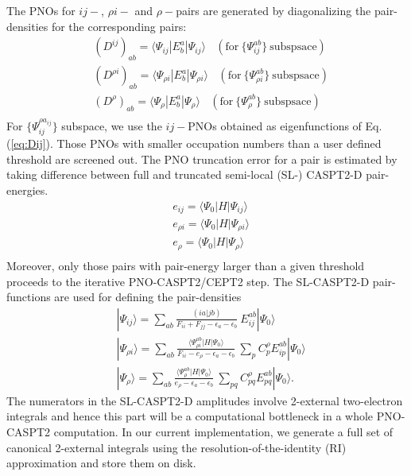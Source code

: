 \documentclass[aip,jcp,amsmath,twocolumn,floatfix,reprint,fleqn]{revtex4-1}
\begin{document}
%
The PNOs for $ij-$, $\rho i-$ and $\rho-$pairs are generated by diagonalizing the pair-densities for the corresponding pairs:
%
\begin{align}
  &(D^{ij})_{ab}    =\langle\Psi_{ij}    |E^a_b|\Psi_{ij}    \rangle \ \ \ \ (\text{for}\ \{\Psi_{ij}^{ab}\}\ \text{subspsace}) \label{eq:Dij}\\
  &(D^{\rho i})_{ab}=\langle\Psi_{\rho i}|E^a_b|\Psi_{\rho i}\rangle \ \ \ \ (\text{for}\ \{\Psi_{\rho i}^{ab}\}\ \text{subspsace})\\
  &(D^{\rho})_{ab}  =\langle\Psi_{\rho}  |E^a_b|\Psi_{\rho}  \rangle \ \ \ \ (\text{for}\ \{\Psi_{\rho}^{ab}\}\ \text{subspsace})\\  
\end{align}
%
For $\{\Psi_{ij}^{\rho a_{ij}}\}$ subspace, we use the $ij-$PNOs obtained as eigenfunctions of Eq. (\ref{eq:Dij}).
%
Those PNOs with smaller occupation numbers than a user defined threshold are screened out.
%
The PNO truncation error for a pair is estimated by taking difference between full and truncated semi-local (SL-) CASPT2-D pair-energies.
%
\begin{align}
  &e_{ij}=\langle\Psi_0|H|\Psi_{ij}\rangle \\
  &e_{\rho i}=\langle\Psi_0|H|\Psi_{\rho i}\rangle \\
  &e_{\rho}=\langle\Psi_0|H|\Psi_{\rho}\rangle \\  
\end{align}
%
Moreover, only those pairs with pair-energy larger than a given threshold proceeds to the iterative PNO-CASPT2/CEPT2 step.
%
The SL-CASPT2-D pair-functions are used for defining the pair-densities
%
\begin{align}
  &|\Psi_{ij}\rangle=\sum_{ab}\frac{(ia|jb)}{F_{ii}+F_{jj}-\epsilon_a-\epsilon_b}\ E_{ij}^{ab}|\Psi_0\rangle \\
  &|\Psi_{\rho i}\rangle=\sum_{ab}\frac{\langle\Psi_{\rho i}^{ab}|H|\Psi_0\rangle}{F_{ii}-e_\rho-\epsilon_a-\epsilon_b}\ \sum_{p} C_p^\rho E_{ip}^{ab}|\Psi_0\rangle \\
  &|\Psi_{\rho}\rangle=\sum_{ab}\frac{\langle\Psi_{\rho}^{ab}|H|\Psi_0\rangle}{e_\rho-\epsilon_a-\epsilon_b}\ \sum_{pq} C_{pq}^\rho E_{pq}^{ab}|\Psi_0\rangle.
\end{align}
%
The numerators in the SL-CASPT2-D amplitudes involve 2-external two-electron integrals and hence this part will be a computational bottleneck in a whole PNO-CASPT2 computation.
%
In our current implementation, we generate a full set of canonical 2-external integrals using the resolution-of-the-identity (RI) approximation and store them on disk.
\end{document}
